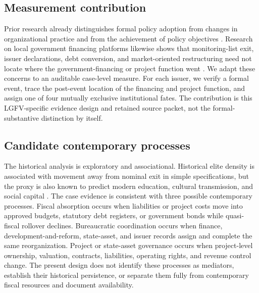 \subsection{Measurement contribution}

Prior research already distinguishes formal policy adoption from changes in
organizational practice and from the achievement of policy objectives
\citep{bromley_powell_2012_decoupling,de_bree_stoopendaal_2020_recoupling}.
Research on local government financing platforms likewise shows that
monitoring-list exit, issuer declarations, debt conversion, and market-oriented
restructuring need not locate where the government-financing or project
function went
\citep{jin_rial_2016_lgfv_ppp,feng_wu_zhang_2022_jiaxing,fang_lu_2024_classified_regulation,li_he_ai_2025_transformation}.
We adapt these concerns to an auditable case-level measure. For each issuer, we
verify a formal event, trace the post-event location of the financing and
project function, and assign one of four mutually exclusive institutional
fates. The contribution is this LGFV-specific evidence design and retained
source packet, not the formal-substantive distinction by itself.

\subsection{Candidate contemporary processes}

The historical analysis is exploratory and associational. Historical elite
density is associated with movement away from nominal exit in simple
specifications, but the proxy is also known to predict modern education,
cultural transmission, and social capital
\citep{chen_kung_ma_2020_keju}. The case evidence is consistent with three
possible contemporary processes. Fiscal absorption occurs when liabilities or
project costs move into approved budgets, statutory debt registers, or
government bonds while quasi-fiscal rollover declines. Bureaucratic
coordination occurs when finance, development-and-reform, state-asset, and
issuer records assign and complete the same reorganization. Project or
state-asset governance occurs when project-level ownership, valuation,
contracts, liabilities, operating rights, and revenue control change. The
present design does not identify these processes as mediators, establish their
historical persistence, or separate them fully from contemporary fiscal
resources and document availability.
